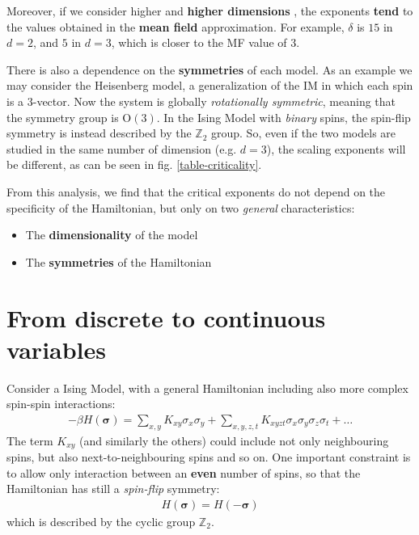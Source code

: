 \documentclass[../../main.tex]{subfiles}
\begin{document}
Moreover, if we consider higher and \textbf{higher dimensions} , the exponents \textbf{tend} to the values obtained in the \textbf{mean field} approximation. For example, $\delta$ is $15$ in $d=2$, and $5$ in $d=3$, which is closer to the MF value of $3$.

There is also a dependence on the \textbf{symmetries} of each model. As an example we may consider the Heisenberg model, a generalization of the IM in which each spin is a $3$-vector. Now the system is globally \textit{rotationally symmetric}, meaning that the symmetry group is $\mathrm{O}(3)$. In the Ising Model with \textit{binary} spins, the spin-flip symmetry is instead described by the $\mathbb{Z}_2$ group. So, even if the two models are studied in the same number of dimension (e.g. $d=3$), the scaling exponents will be different, as can be seen in fig. \ref{table-criticality}. 

\medskip

From this analysis, we find that the critical exponents do not depend on the specificity of the Hamiltonian, but only on two \textit{general} characteristics:
\begin{itemize}
    \item The \textbf{dimensionality} of the model
    \item The \textbf{symmetries} of the Hamiltonian  
\end{itemize}

\section{From discrete to continuous variables}
Consider a Ising Model, with a general Hamiltonian including also more complex spin-spin interactions:
\begin{align}\label{eqn:H-complex}
    -\beta H(\bm{\sigma}) = \sum_{x,y} K_{xy} \sigma_x \sigma_y + \sum_{x,y,z,t} K_{xyzt} \sigma_x \sigma_y \sigma_z \sigma_t + \dots
\end{align}
The term $K_{xy}$ (and similarly the others) could include not only neighbouring spins, but also next-to-neighbouring spins and so on. One important constraint is to allow only interaction between an \textbf{even} number of spins, so that the Hamiltonian has still a \textit{spin-flip} symmetry:
\begin{align*}
    H(\bm{\sigma}) = H(-\bm{\sigma})
\end{align*}  
which is described by the cyclic group $\mathbb{Z}_2$.
\end{document}

